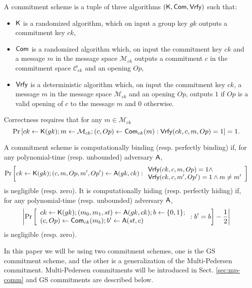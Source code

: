
\begin{definition} A commitment scheme is a tuple of three algorithms 
	$(\mathsf{K},\mathsf{Com},\mathsf{Vrfy})$ such that:
	\begin{itemize} 
		\item  $\mathsf{K}$ is a randomized algorithm, which on input a group key $gk$ outputs a commitment key $ck$,
		\item $\mathsf{Com}$ is a randomized algorithm which, on input the commitment key $ck$ and a message 
		$m$ in the message space $\mathcal{M}_{ck}$ outputs a commitment $c$ in the commitment space $\mathcal{C}_{ck}$ and an opening $Op$, 
	\item $\mathsf{Vrfy}$ is a deterministic algorithm which, on input the commitment key $ck$,  a message 
	$m$ in the message space $\mathcal{M}_{ck}$ and an opening $Op$, outputs $1$ if $Op$ is a valid opening of $c$ to the message $m$ and $0$ otherwise. 
	\end{itemize}
\end{definition}

Correctness requires that for any $m \in \mathcal{M}_{ck}$
$$\Pr\left[ck \gets \mathsf{K}(gk); m \gets \mathcal{M}_{ck}; 
(c, Op) \gets \mathsf{Com}_{ck}(m): \mathsf{Vrfy}(ck,c,m,Op)=1 \right]=1.$$


\begin{definition}  A commitment scheme is computationally binding (resp. perfectly binding) if, for any polynomial-time (resp. unbounded)  adversary $\mathsf{A}$, 
	$$\Pr\left[ck \gets \mathsf{K}(gk); (c,m,Op,m',Op') \gets \mathsf{A}(gk,ck): \begin{array}{l}\mathsf{Vrfy}(ck,c,m,Op)=1 \wedge\\ \mathsf{Vrfy}(ck,c,m',Op')=1 \wedge m\neq m'\end{array}\right] $$
	is negligible (resp. zero).  It is computationally hiding (resp. perfectly hiding)  if, for any polynomial-time (resp. unbounded) adversary $\mathsf{A}$,
	$$\left|\Pr\left[ \begin{array}{l} ck \gets \mathsf{K}(gk); (m_0,m_1,st) \gets \mathsf{A}(gk,ck); b \gets \{0,1\};\\ (c,Op) \gets \mathsf{Com}_{ck}(m_b); b' \gets \mathsf{A}(st,c)
                      \end{array} : b'=b\right] -\dfrac{1}{2} \right|$$
	is negligible (resp. zero).
\end{definition}

In this paper we will be using two commitment schemes, one is the GS commitment scheme, and the other is a generalization of the Multi-Pedersen commitment. Multi-Pedersen commitments will be introduced in Sect. \ref{sec:mp-comm} and GS commitments are described below.


